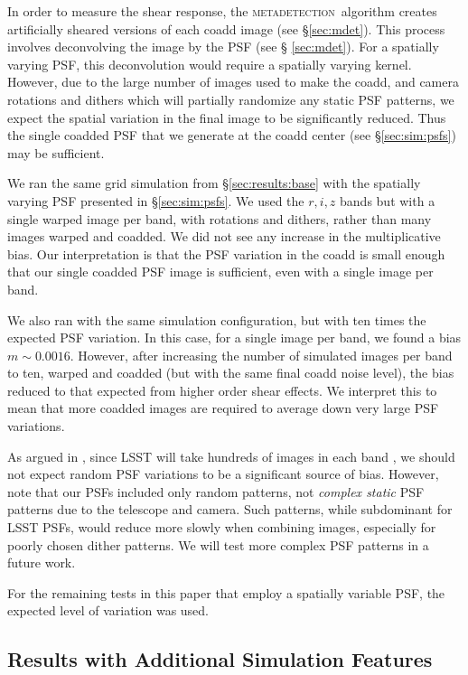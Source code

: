 \documentclass[twocolumn,twocolappendix,astrosym]{openjournal}
\newcommand{\mdet}{\textsc{metadetection}}
\begin{document}
In order to measure the shear response, the \mdet\ algorithm creates
artificially sheared versions of each coadd image (see \S \ref{sec:mdet}).
This process involves deconvolving the image by the PSF (see \S
\ref{sec:mdet}).  For a spatially varying PSF, this deconvolution would require a
spatially varying kernel.  However, due to the large number of images used to
make the coadd, and camera rotations and dithers which will partially randomize
any static PSF patterns, we expect the spatial variation in the final image
to be significantly reduced.  Thus the single coadded PSF that we generate at
the coadd center (see \S \ref{sec:sim:psfs}) may be sufficient.

We ran the same grid simulation from \S \ref{sec:results:base} with the
spatially varying PSF presented in \S \ref{sec:sim:psfs}. We used the $r, i, z$
bands but with a single warped image per band, with rotations and dithers,
rather than many images warped and coadded.  We did not see any increase in the
multiplicative bias.   Our interpretation is that the PSF variation in the
coadd is small enough that our single coadded PSF image is sufficient, even
with a single image per band.

We also ran with the same simulation configuration, but with ten times the
expected PSF variation. In this case, for a single image per band, we found a
bias $m \sim 0.0016$.  However, after increasing the number of simulated images
per band to ten, warped and coadded (but with the same final coadd noise
level), the bias reduced to that expected from higher order shear effects.  We
interpret this to mean that more coadded images are required to average down
very large PSF variations.

As argued in \citet{mdet20}, since LSST will take hundreds of images in each
band \citep{IvezicLSST2008}, we should not expect random PSF variations to be a
significant source of bias.  However, note that our PSFs included only random
patterns, not {\em complex static} PSF patterns due to the telescope and
camera. Such patterns, while subdominant for LSST PSFs, would reduce more
slowly when combining images, especially for poorly chosen dither
patterns. We will test more complex PSF patterns in a future work.

For the remaining tests in this paper that employ a spatially variable PSF, the
expected level of variation was used.

\subsection{Results with Additional Simulation Features} \label{sec:results:more}
\end{document}
